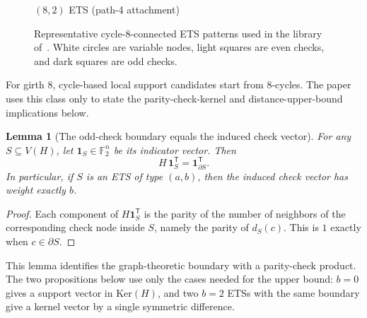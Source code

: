 \documentclass[11pt]{article}
\newcommand{\Ftwo}{\mathbb{F}_2}
\newcommand{\Ker}{\mathrm{Ker}}
\theoremstyle{uprightthm}
\newtheorem{lemma}[theorem]{Lemma}
\begin{document}
\begin{figure}[t]
\begin{minipage}{0.70\linewidth}
\par
$(8,2)$ ETS (path-4 attachment)
\end{minipage}
\caption{Representative cycle-8-connected ETS patterns used in the library
of~\cite{Kasai2026}.  White circles are variable nodes, light squares are even
checks, and dark squares are odd checks.}
\label{fig:cycle8-connected-ets-en}
\end{figure}

For girth $8$, cycle-based local support candidates start from $8$-cycles.  The
paper uses this class only to state the
parity-check-kernel and distance-upper-bound implications below.

\begin{lemma}[The odd-check boundary equals the induced check vector]
\label{lem:cycle8-boundary-syndrome-en}
For any $S\subseteq V(H)$, let $\mathbf{1}_S\in\Ftwo^n$ be its indicator vector. Then
\[
H\,\mathbf{1}_S^{\mathsf T}=\mathbf{1}_{\partial S}^{\mathsf T}.
\]
In particular, if $S$ is an ETS of type $(a,b)$, then the induced check vector has weight exactly $b$.
\end{lemma}

\begin{proof}
Each component of $H\mathbf{1}_S^{\mathsf T}$ is the parity of the number of neighbors of the corresponding check node inside $S$, namely the parity of $d_S(c)$. This is $1$ exactly when $c\in\partial S$.
\end{proof}

This lemma identifies the graph-theoretic boundary with a parity-check product.
The two propositions below use only the cases needed for the upper
bound: $b=0$ gives a support vector in $\Ker(H)$, and two $b=2$ ETSs with the
same boundary give a kernel vector by a single symmetric difference.
\end{document}
